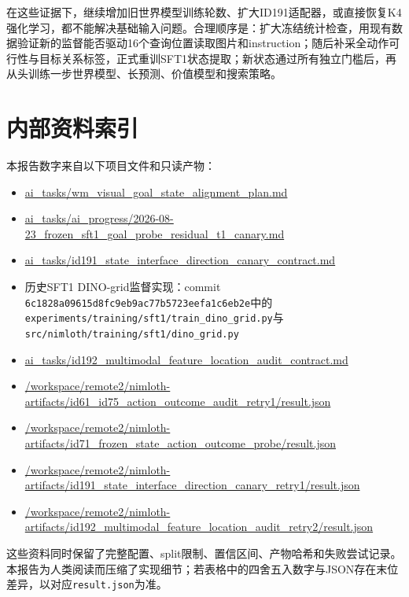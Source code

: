 \documentclass[UTF8,11pt,a4paper,fontset=none]{ctexart}
\newcommand{\code}[1]{\texttt{#1}}
\begin{document}
在这些证据下，继续增加旧世界模型训练轮数、扩大ID191适配器，或直接恢复K4强化学习，都不能解决基础输入问题。合理顺序是：扩大冻结统计检查，用现有数据验证新的监督能否驱动16个查询位置读取图片和instruction；随后补采全动作可行性与目标关系标签，正式重训SFT1状态提取；新状态通过所有独立门槛后，再从头训练一步世界模型、长预测、价值模型和搜索策略。

\appendix
\section{内部资料索引}

本报告数字来自以下项目文件和只读产物：

\begin{itemize}
  \item \url{ai_tasks/wm_visual_goal_state_alignment_plan.md}
  \item \url{ai_tasks/ai_progress/2026-08-23_frozen_sft1_goal_probe_residual_t1_canary.md}
  \item \url{ai_tasks/id191_state_interface_direction_canary_contract.md}
  \item 历史SFT1 DINO-grid监督实现：commit \code{6c1828a09615d8fc9eb9ac77b5723eefa1c6eb2e}中的\code{experiments/training/sft1/train\_dino\_grid.py}与\code{src/nimloth/training/sft1/dino\_grid.py}
  \item \url{ai_tasks/id192_multimodal_feature_location_audit_contract.md}
  \item \url{/workspace/remote2/nimloth-artifacts/id61_id75_action_outcome_audit_retry1/result.json}
  \item \url{/workspace/remote2/nimloth-artifacts/id71_frozen_state_action_outcome_probe/result.json}
  \item \url{/workspace/remote2/nimloth-artifacts/id191_state_interface_direction_canary_retry1/result.json}
  \item \url{/workspace/remote2/nimloth-artifacts/id192_multimodal_feature_location_audit_retry2/result.json}
\end{itemize}

这些资料同时保留了完整配置、split限制、置信区间、产物哈希和失败尝试记录。本报告为人类阅读而压缩了实现细节；若表格中的四舍五入数字与JSON存在末位差异，以对应\code{result.json}为准。
\end{document}
